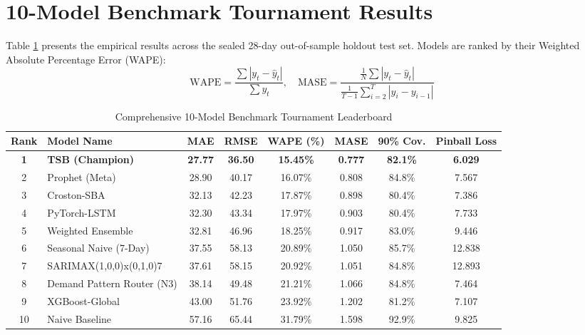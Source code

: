 \documentclass[12pt,a4paper,oneside]{report}
\theoremstyle{definition}
\begin{document}
\section{10-Model Benchmark Tournament Results}
Table \ref{tab:benchmark_results} presents the empirical results across the sealed 28-day out-of-sample holdout test set. Models are ranked by their Weighted Absolute Percentage Error (WAPE):
\begin{equation}
\text{WAPE} = \frac{\sum |y_t - \hat{y}_t|}{\sum y_t}, \quad \text{MASE} = \frac{\frac{1}{N}\sum |y_t - \hat{y}_t|}{\frac{1}{T-1}\sum_{i=2}^T |y_i - y_{i-1}|}
\end{equation}

\begin{table}[H]
\centering
\small
\caption{Comprehensive 10-Model Benchmark Tournament Leaderboard}
\label{tab:benchmark_results}
\begin{tabularx}{\textwidth}{clcccccc}
\toprule
\textbf{Rank} & \textbf{Model Name} & \textbf{MAE} & \textbf{RMSE} & \textbf{WAPE (\%)} & \textbf{MASE} & \textbf{90\% Cov.} & \textbf{Pinball Loss} \\
\midrule
\textbf{1} & \textbf{TSB (Champion)} & \textbf{27.77} & \textbf{36.50} & \textbf{15.45\%} & \textbf{0.777} & \textbf{82.1\%} & \textbf{6.029} \\
2 & Prophet (Meta) & 28.90 & 40.17 & 16.07\% & 0.808 & 84.8\% & 7.567 \\
3 & Croston-SBA & 32.13 & 42.23 & 17.87\% & 0.898 & 80.4\% & 7.386 \\
4 & PyTorch-LSTM & 32.30 & 43.34 & 17.97\% & 0.903 & 80.4\% & 7.733 \\
5 & Weighted Ensemble & 32.81 & 46.96 & 18.25\% & 0.917 & 83.0\% & 9.446 \\
6 & Seasonal Naive (7-Day) & 37.55 & 58.13 & 20.89\% & 1.050 & 85.7\% & 12.838 \\
7 & SARIMAX(1,0,0)x(0,1,0)7 & 37.61 & 58.15 & 20.92\% & 1.051 & 84.8\% & 12.893 \\
8 & Demand Pattern Router (N3) & 38.14 & 49.48 & 21.21\% & 1.066 & 84.8\% & 7.464 \\
9 & XGBoost-Global & 43.00 & 51.76 & 23.92\% & 1.202 & 81.2\% & 7.107 \\
10 & Naive Baseline & 57.16 & 65.44 & 31.79\% & 1.598 & 92.9\% & 9.825 \\
\bottomrule
\end{tabularx}
\end{table}
\end{document}

